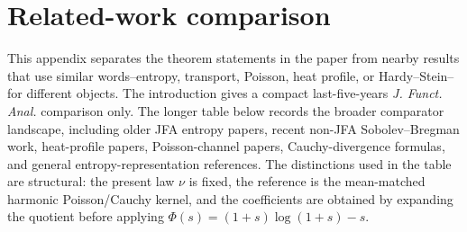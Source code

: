 \section{Related-work comparison}%
\label{app:related-work-scope}

This appendix separates the theorem statements in the paper from nearby
results that use similar words--entropy, transport, Poisson, heat profile,
or Hardy--Stein--for different objects.  The introduction gives a compact
last-five-years \emph{J. Funct. Anal.} comparison only.  The longer table
below records the broader comparator landscape, including older JFA entropy
papers, recent non-JFA Sobolev--Bregman work, heat-profile papers,
Poisson-channel papers, Cauchy-divergence formulas, and general
entropy-representation references.  The distinctions used in the table are
structural: the present law \(\nu\) is fixed, the reference is the
mean-matched harmonic Poisson/Cauchy kernel, and the coefficients are obtained
by expanding the quotient before applying
\(\Phi(s)=(1+s)\log(1+s)-s\).

